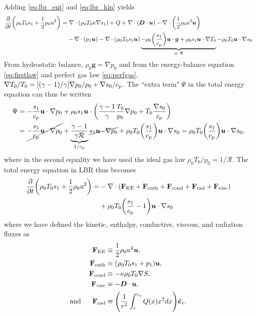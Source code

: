\documentclass[12pt]{article} %
\newcommand{\pderiv}[2]{\frac{\partial#1}{\partial#2}}
\newcommand{\five}{\ \ \ \ \ }
\newcommand{\e}{\hat{\bm{e}}}
\newcommand{\Div}{\nabla\cdot}
\newcommand{\cp}{c_{\rm{p}}}
\newcommand{\ro}{r_{\rm{o}}}
\begin{document}
	Adding \eqref{eq:lbr_ent} and \eqref{eq:lbr_kin} yields
	\begin{align*}
	\pderiv{}{t}\bigg{(}\rho_0T_0s_1 + \frac{1}{2}\rho_0u^2\bigg{)} =&\ \Div(\rho_0T_0\kappa\nabla s_1) + Q + \Div(\bm{D}\cdot\bm{u}) - \Div\bigg{(}\frac{1}{2}\rho_0u^2\bm{u}\bigg{)}\\ &- \Div(p_1\bm{u}) - \Div(\rho_0T_0s_1\bm{u}) \underbrace{- \rho_0\bigg{(}\frac{s_1}{\cp}\bigg{)}\bm{u}\cdot\bm{g} + \rho_0s_1\bm{u}\cdot\nabla T_0}_{\equiv\ \Psi} - \rho_0T_0\bm{u}\cdot\nabla s_0
	\end{align*}
	From hydrostatic balance, $\rho_0\bm{g} = \nabla p_0$ and from the energy-balance equation \eqref{eq:firstlaw} and perfect gas law \eqref{eq:perfgas}, $\nabla T_0/T_0 = [(\gamma - 1)/\gamma]\nabla p_0/p_0 + \nabla s_0/\cp$. The ``extra term" $\Psi$ in the total energy  equation can thus be written
	\begin{align*}
	\Psi &= -\frac{s_1}{\cp}\bm{u}\cdot\nabla p_0 + \rho_0 s_1\bm{u}\cdot\bigg{(}\frac{\gamma-1}{\gamma}\frac{T_0}{p_0}\nabla p_0 + T_0\frac{\nabla s_0}{\cp}\bigg{)}\\
	&=  \cancel{-\frac{s_1}{\cp}\bm{u}\cdot\nabla p_0} + \underbrace{\frac{\gamma-1}{\gamma\mathcal{R}}}_{1/\cp}\cancel{s_1\bm{u}\cdot\nabla p_0} + \rho_0T_0\bigg{(}\frac{s_1}{\cp}\bigg{)}\bm{u}\cdot\nabla s_0 = \rho_0T_0\bigg{(}\frac{s_1}{\cp}\bigg{)}\bm{u}\cdot\nabla s_0,
	\end{align*}
	where in the second equality we have used the ideal gas law $\rho_0 T_0/p_0 = 1/\mathcal{R}$. The total energy equation in LBR thus becomes
	\begin{align}\label{eq:lbr_toten}
	\pderiv{}{t}\bigg{(}\rho_0T_0s_1 + \frac{1}{2}\rho_0u^2\bigg{)} = &-\nabla\cdot(\mathbf{F}_{\rm{KE}}+\mathbf{F}_{\rm{enth}} +\mathbf{F}_{\rm{cond}} + \mathbf{F}_{\rm{rad}} + \mathbf{F}_{\rm{visc}} )\nonumber\\
	& + \rho_0T_0\bigg{(}\frac{s_1}{\cp} - 1\bigg{)}\bm{u}\cdot\nabla s_0
	\end{align}
	where we have defined the kinetic, enthalpy, conductive, viscous, and radiation fluxes as
	\begin{align}
	\mathbf{F}_{\rm{KE}} &\equiv \frac{1}{2}\rho_0u^2\bm{u},\\
	\mathbf{F}_{\rm{enth}} &\equiv (\rho_0 T_0 s_1 + p_1)\bm{u},\\
	\mathbf{F}_{\rm{cond}} &\equiv -\kappa\rho_0T_0\nabla S,\\
	\mathbf{F}_{\rm{visc}} &\equiv  -\bm{D}\cdot\bm{u},\\
	\text{and}\five \mathbf{F}_{\rm{rad}} &\equiv \Bigg{(}\frac{1}{r^2}\int_r^{{\ro}}Q(x)x^2dx\Bigg{)}\e_r. 
	\end{align}
\end{document}
